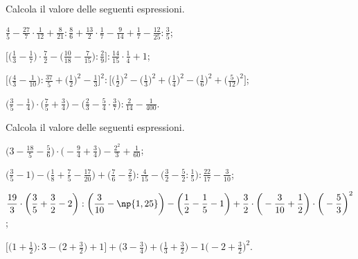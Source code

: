 \begin{esercizio}[\Ast]%
 \label{ese:3.140}
Calcola il valore delle seguenti espressioni.
\begin{enumeratea}
\spazielenx
\item $\displaystyle{\frac{4}{5}-\frac{27}{7}\cdot{\frac{1}{12}}+\frac{8}{21}:\frac{8}{6}+\frac{13}{2}\cdot
\frac{1}{7}-\frac{9}{14}+\frac{1}{7}-\frac{12}{25}:\frac{3}{5}}$;
\item $\displaystyle{\bigg[\bigg(\frac{1}{3}-\frac{1}{7}\bigg)\cdot
{\frac{7}{2}}-\bigg(\frac{10}{18}-\frac{7}{15}\bigg):\frac{2}{9}\bigg]:\frac{14}{15}\cdot
{\frac{1}{4}}+1}$;
\item $\displaystyle{\bigg[\bigg(\frac{4}{3}-\frac{1}{10}\bigg):\frac{37}{5}+\bigg(\frac{1}{2}\bigg)^{2}-\frac{1}{3}%
\bigg]^{2}:\bigg[\bigg(\frac{1}{2}\bigg)^{2}-\bigg(\frac{1}{3}\bigg)^{2}+\bigg(\frac{1}{4}\bigg)^{2}-%
\bigg(\frac{1}{6}\bigg)^{2}+\bigg(\frac{5}{12}\bigg)^{2}\bigg]}$;
\item $\displaystyle{\bigg(\frac{3}{5}-\frac{1}{4}\bigg)\cdot\bigg(\frac{7}{5}+\frac{3}{4}\bigg)-\bigg(\frac{2}{3}-%
\frac{5}{4}\cdot\frac{3}{7}\bigg):\frac{2}{14}-\frac{1}{400}}$.
\end{enumeratea}
\end{esercizio}

\begin{esercizio}[\Ast]%
 \label{ese:3.141}
 Calcola il valore delle seguenti espressioni.
\begin{enumeratea}
\spazielenx
\item $\displaystyle{\bigg(3-\frac{18}{5}-\frac{5}{6}\bigg)\cdot%
\bigg(-{\frac{9}{4}}+\frac{3}{4}\bigg)-\frac{2^{2}}{3}+\frac{1}{60}}$;
\item $\displaystyle{\bigg(\frac{3}{5}-1\bigg)-\bigg(\frac{1}{8}+\frac{7}{5}-\frac{17}{20}\bigg)+%
\bigg(\frac{7}{6}-\frac{2}{5}\bigg):\frac{4}{15}-\bigg(\frac{3}{2}-\frac{5}{2}:\frac{1}{5}\bigg):\frac{22}{17}-%
\frac{3}{10}}$;
\item $\displaystyle{\frac{19}{3}\cdot\bigg(\frac{3}{5}+\frac{3}{2}-2\bigg):\bigg(\frac{3}{10}-\np{1,25}\bigg)-%
\bigg(\frac{1}{2}-\frac{1}{5}-1\bigg)+\frac{3}{2}\cdot\bigg(-{\frac{3}{10}}+\frac{1}{2}\bigg)\cdot%
\bigg(-{\frac{5}{3}}\bigg)^{2}}$;
\item $\displaystyle{\bigg[\bigg(1+\frac{1}{2}\bigg):3-\bigg(2+\frac{3}{2}\bigg)+1\bigg]+\bigg(3-\frac{3}{4}\bigg)%
+\bigg(\frac{1}{3}+\frac{3}{2}\bigg)-1\bigg(-2+\frac{3}{2}\bigg)^{2}}$.
\end{enumeratea}
\end{esercizio}

